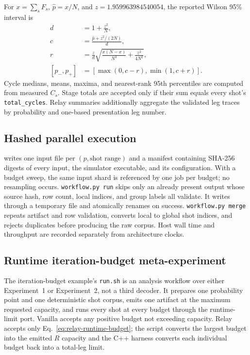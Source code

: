\documentclass[10pt,conference]{IEEEtran}
\begin{document}
For $x=\sum_sF_s$, $\hat p=x/N$, and
$z=1.959963984540054$, the reported Wilson 95\% interval is
\begin{align}
 d&=1+\frac{z^2}{N},\\
 c&=\frac{\hat p+z^2/(2N)}{d},\\
 r&=\frac{z}{d}\sqrt{\frac{x(N-x)}{N^3}+\frac{z^2}{4N^2}},\\
 [p_-,p_+]&=[\max(0,c-r),\min(1,c+r)].
 \label{eq:wilson}
\end{align}
Cycle medians, means, maxima, and nearest-rank 95th percentiles are computed
from measured $C_s$.  Stage totals are accepted only if their sum equals every
shot's \texttt{total\_cycles}.  Relay summaries additionally aggregate the
validated leg traces by probability and one-based presentation leg number.

\subsection{Hashed parallel execution}
 writes one input file per
$(p,\text{shot range})$ and a manifest containing SHA-256 digests of every
input, the simulator executable, and its configuration.  With a budget sweep,
the same input shard is referenced by one job per budget; no resampling occurs.
\texttt{workflow.py run} skips only an already present output whose source hash,
row count, local indices, and group labels all validate.  It writes through a
temporary file and atomically renames on success.  \texttt{workflow.py merge}
repeats artifact and row validation, converts local to global shot indices, and
rejects duplicates before producing the raw corpus.  Host wall time and
throughput are recorded separately from architecture clocks.

\subsection{Runtime iteration-budget meta-experiment}
The iteration-budget example's \texttt{run.sh} is an analysis
workflow over either Experiment~1 or Experiment~2, not a third decoder.  It
prepares one probability point and one deterministic shot corpus, emits one
artifact at the maximum requested capacity, and runs every shot at every budget
through the runtime-limit port.  Vanilla accepts any positive budget not
exceeding capacity.  Relay accepts only Eq.~\eqref{eq:relay-runtime-budget}; the
script converts the largest budget into the emitted $R$ capacity and the C++
harness converts each individual budget back into a total-leg limit.
\end{document}
